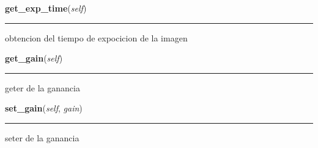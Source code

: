     \label{spectro_metria:spect:get_exp_time}

    \vspace{0.5ex}

\hspace{.8\funcindent}\begin{boxedminipage}{\funcwidth}

    \raggedright \textbf{get\_exp\_time}(\textit{self})

    \vspace{-1.5ex}

    \rule{\textwidth}{0.5\fboxrule}
\setlength{\parskip}{2ex}
    obtencion del tiempo de expocicion de la imagen

\setlength{\parskip}{1ex}
    \end{boxedminipage}

    \label{spectro_metria:spect:get_gain}

    \vspace{0.5ex}

\hspace{.8\funcindent}\begin{boxedminipage}{\funcwidth}

    \raggedright \textbf{get\_gain}(\textit{self})

    \vspace{-1.5ex}

    \rule{\textwidth}{0.5\fboxrule}
\setlength{\parskip}{2ex}
    geter de la ganancia

\setlength{\parskip}{1ex}
    \end{boxedminipage}

    \label{spectro_metria:spect:set_gain}

    \vspace{0.5ex}

\hspace{.8\funcindent}\begin{boxedminipage}{\funcwidth}

    \raggedright \textbf{set\_gain}(\textit{self}, \textit{gain})

    \vspace{-1.5ex}

    \rule{\textwidth}{0.5\fboxrule}
\setlength{\parskip}{2ex}
    seter de la ganancia

\setlength{\parskip}{1ex}
    \end{boxedminipage}

